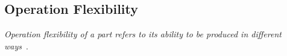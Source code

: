 %
%

\subsection{Operation Flexibility}
\emph{Operation flexibility of a part refers to its ability to be produced in different ways}~\cite{Sethi.1990}.



